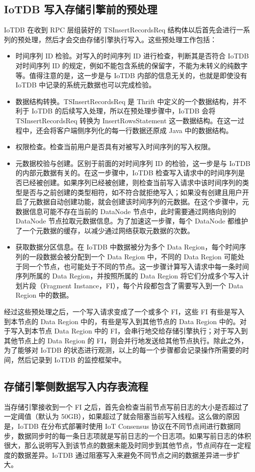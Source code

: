 \subsection{IoTDB 写入存储引擎前的预处理}
IoTDB 在收到 RPC 层组装好的 TSInsertRecordsReq 结构体以后首先会进行一系列的预处理，然后才会交由存储引擎执行写入。这些预处理工作包括：
\begin{itemize}
  \item 时间序列 ID 检验。对写入的时间序列 ID 进行检查，判断其是否符合 IoTDB 对时间序列 ID 的规定，例如不能包含系统的保留字，不能为未转义的纯数字等。值得注意的是，这一步是与 IoTDB 内部的信息无关的，也就是即使没有 IoTDB 中记录的系统元数据也可以完成检验。
  \item 数据结构转换。TSInsertRecordsReq 是 Thrift 中定义的一个数据结构，并不利于 IoTDB 的后续写入处理，所以在预处理步骤中，IoTDB 会将 TSInsertRecordsReq 转换为 InsertRowsStatement 这一数据结构。在这一过程中，还会将客户端侧序列化的每一行数据还原成 Java 中的数据结构。
  \item 权限检查。检查当前用户是否具有对被写入时间序列的写入权限。
  \item 元数据校验与创建。区别于前面的对时间序列 ID 的检验，这一步是与 IoTDB 的内部元数据有关的。在这一步骤中，IoTDB 检查写入请求中的时间序列是否已经被创建。如果序列已经被创建，则检查当前写入请求中该时间序列的类型是否与之前创建的类型相符，如不符合就拒绝写入；如果没有创建且用户开启了元数据自动创建功能，就会创建该时间序列的元数据。在这个步骤中，元数据信息可能不存在当前的 DataNode 节点中，此时需要通过网络向别的 DataNode 节点拉取元数据信息。为了加速这一步骤，每个 DataNode 都维护了一个元数据的缓存，以减少通过网络获取元数据的次数。
  \item 获取数据分区信息。在 IoTDB 中数据被分为多个 Data Region，每个时间序列的一段数据会被分配到一个 Data Region 中，不同的 Data Region 可能处于同一个节点，也可能处于不同的节点。这一步骤计算写入请求中每一条时间序列所属的 Data Region，并按照所属的 Data Region 将它们分成多个写入计划片段（Fragment Instance，FI），每个片段都包含了需要写入到一个 Data Region 中的数据。
\end{itemize}
经过这些预处理之后，一个写入请求变成了一个或多个 FI，这些 FI 有些是写入到本节点的 Data Region 中的，有些是写入到其他节点的 Data Region 中的。对于写入到本节点 Data Region 中的 FI，会串行地交给存储引擎执行；对于写入到其他节点上的 Data Region 的 FI，则会并行地发送给其他节点执行。除此之外，为了能够对 IoTDB 的状态进行观测，以上的每一个步骤都会记录操作所需要的时间，然后记录到 IoTDB 的监控框架中。
\subsection{存储引擎侧数据写入内存表流程}
当存储引擎接收到一个 FI 之后，首先会检查当前节点写前日志的大小是否超过了一定阈值（默认为 50GB），如果超过了就会阻塞当前写入线程。这么做的原因是，IoTDB 在分布式部署时使用 IoT Consensus 协议在不同节点间进行数据同步\cite{wang2023apache}，数据同步时的每一条日志项就是写前日志的一个日志项。如果写前日志的体积很大，那么说明写入到该节点的数据未能及时同步到其他节点，节点间存在一定程度的数据差异。IoTDB 通过阻塞写入来避免不同节点之间的数据差异进一步扩大。

